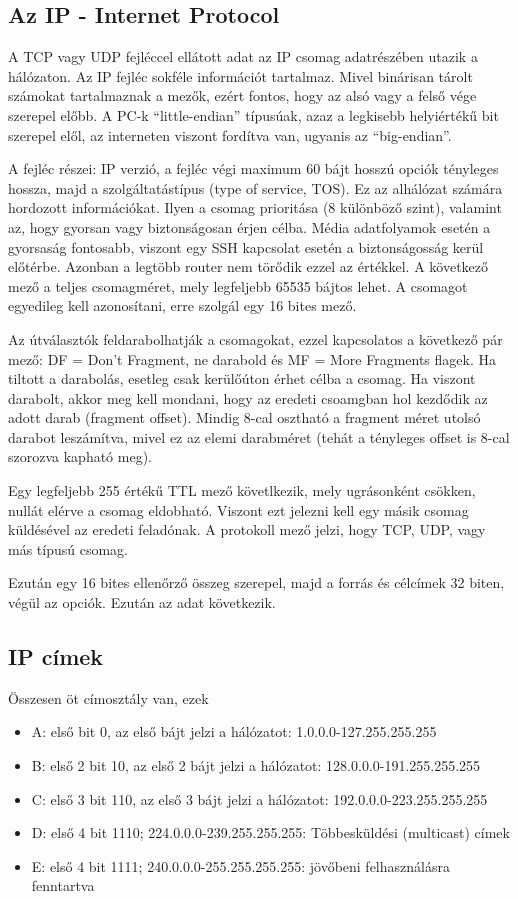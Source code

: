 \documentclass[fleqn,10pt,a4paper]{article}
\theoremstyle{magyar}
\begin{document}
  \subsection{Az IP - Internet Protocol}
  A TCP vagy UDP fejléccel ellátott adat az IP csomag adatrészében utazik a hálózaton. Az IP fejléc sokféle információt
  tartalmaz. Mivel binárisan tárolt számokat tartalmaznak a mezők, ezért fontos, hogy az alsó vagy a felső vége szerepel
  előbb. A PC-k ``little-endian'' típusúak, azaz a legkisebb helyiértékű bit szerepel elől, az interneten viszont
  fordítva van, ugyanis az ``big-endian''.
  
  A fejléc részei: IP verzió, a fejléc végi maximum 60 bájt hosszú opciók tényleges hossza, majd a szolgáltatástípus
  (type of service, TOS). Ez az alhálózat számára hordozott információkat. Ilyen a csomag prioritása (8 különböző
  szint), valamint az, hogy gyorsan vagy biztonságosan érjen célba. Média adatfolyamok esetén a gyorsaság fontosabb,
  viszont egy SSH kapcsolat esetén a biztonságosság kerül előtérbe. Azonban a legtöbb router nem törődik ezzel az
  értékkel. A következő mező a teljes csomagméret, mely legfeljebb 65535 bájtos lehet. A csomagot egyedileg kell
  azonosítani, erre szolgál egy 16 bites mező.

  Az útválasztók feldarabolhatják a csomagokat, ezzel kapcsolatos a következő pár mező: DF = Don't Fragment, ne darabold
  és MF = More Fragments flagek. Ha tiltott a darabolás, esetleg csak kerülőúton érhet célba a csomag. Ha viszont
  darabolt, akkor meg kell mondani, hogy az eredeti csoamgban hol kezdődik az adott darab (fragment offset). Mindig
  8-cal osztható a fragment méret utolsó darabot leszámítva, mivel ez az elemi darabméret (tehát a tényleges offset is
  8-cal szorozva kapható meg).
  
  Egy legfeljebb 255 értékű TTL mező követlkezik, mely ugrásonként csökken, nullát elérve a csomag eldobható. Viszont
  ezt jelezni kell egy másik csomag küldésével az eredeti feladónak. A protokoll mező jelzi, hogy TCP, UDP, vagy más
  típusú csomag.

  Ezután egy 16 bites ellenőrző összeg szerepel, majd a forrás és célcímek 32 biten, végül az opciók. Ezután az adat
  következik.

  \subsection{IP címek}
  Összesen öt címosztály van, ezek
  \begin{itemize}
  \item A: első bit 0, az első bájt jelzi a hálózatot: 1.0.0.0-127.255.255.255
  \item B: első 2 bit 10, az első 2 bájt jelzi a hálózatot: 128.0.0.0-191.255.255.255
  \item C: első 3 bit 110, az első 3 bájt jelzi a hálózatot: 192.0.0.0-223.255.255.255
  \item D: első 4 bit 1110; 224.0.0.0-239.255.255.255: Többesküldési (multicast) címek
  \item E: első 4 bit 1111; 240.0.0.0-255.255.255.255: jövőbeni felhasználásra fenntartva
  \end{itemize}
\end{document}
